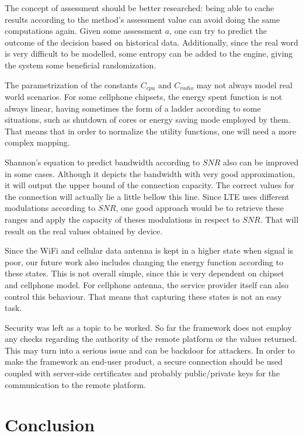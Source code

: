 \documentclass[10pt, conference, letterpaper]{IEEEtran}
\begin{document}
  The concept of assessment should be better researched: being able to cache results according to the method's assessment value can avoid doing the same computations again. Given some assessment $a$, one can try to predict the outcome of the decision based on historical data. Additionally, since the real word is very difficult to be modelled, some entropy can be added to the engine, giving the system some beneficial randomization.

  The parametrization of the constants $C_{cpu}$ and $C_{radio}$ may not always model real world scenarios. For some cellphone chipsets, the energy spent function is not always linear, having sometimes the form of a ladder according to some situations, such as shutdown of cores or energy saving mode employed by them. That means that in order to normalize the utility functions, one will need a more complex mapping.

  Shannon's equation to predict bandwidth according to $SNR$ also can be improved in some cases. Although it depicts the bandwidth with very good approximation, it will output the upper bound of the connection capacity. The correct values for the connection will actually lie a little bellow this line. Since LTE uses different modulations according to $SNR$, one good approach would be to retrieve these ranges and apply the capacity of theses modulations in respect to $SNR$. That will result on the real values obtained by device.

  Since the WiFi and cellular data antenna is kept in a higher state when signal is poor, our future work also includes changing the energy function according to these states. This is not overall simple, since this is very dependent on chipset and cellphone model. For cellphone antenna, the service provider itself can also control this behaviour. That means that capturing these states is not an easy task.

  Security was left as a topic to be worked. So far the framework does not employ any checks regarding the authority of the remote platform or the values returned. This may turn into a serious issue and can be backdoor for attackers. In order to make the framework an end-user product, a secure connection should be used coupled with server-side certificates and probably public/private keys for the communication to the remote platform.

  \section{Conclusion}
\end{document}

